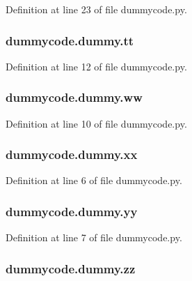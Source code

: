 Definition at line 23 of file dummycode.\-py.

\subsubsection[{tt}]{\setlength{\rightskip}{0pt plus 5cm}dummycode.\-dummy.\-tt}\label{classdummycode_1_1dummy_ac1a6206c9bd102d051018258c3b54de9}


Definition at line 12 of file dummycode.\-py.

\subsubsection[{ww}]{\setlength{\rightskip}{0pt plus 5cm}dummycode.\-dummy.\-ww}\label{classdummycode_1_1dummy_a65b1604eb43ffa41eb49a02655397fb7}


Definition at line 10 of file dummycode.\-py.

\subsubsection[{xx}]{\setlength{\rightskip}{0pt plus 5cm}dummycode.\-dummy.\-xx}\label{classdummycode_1_1dummy_af1ae41fb24a1c0a52ae60bd1f2db9f5f}


Definition at line 6 of file dummycode.\-py.

\subsubsection[{yy}]{\setlength{\rightskip}{0pt plus 5cm}dummycode.\-dummy.\-yy}\label{classdummycode_1_1dummy_ad0f056c4695b2525f883dbe1004fa7ba}


Definition at line 7 of file dummycode.\-py.

\subsubsection[{zz}]{\setlength{\rightskip}{0pt plus 5cm}dummycode.\-dummy.\-zz}\label{classdummycode_1_1dummy_af5c829ccdb5a89e8ba0f2cf476cb2aa0}


